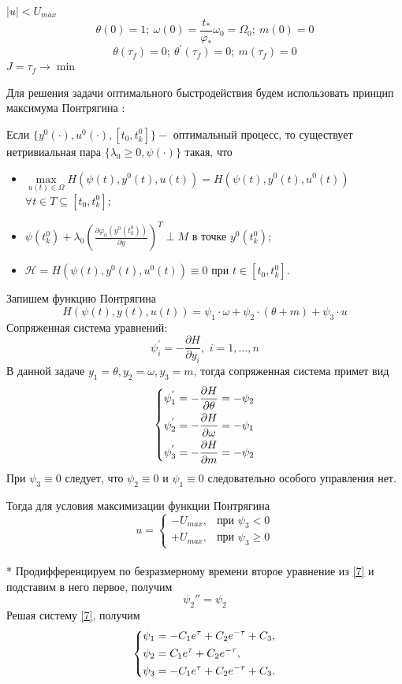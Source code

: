 \documentclass[a4paper,14pt]{article}
\theoremstyle{plain} %
\theoremstyle{definition} %
\theoremstyle{remark} %
\begin{document}
{$|u|<U_{max}$
\[
    \theta(0)=1;\ \omega(0)=\frac{t_\ast}{\varphi_\ast}\omega_0=\Omega_0;\ m(0)=0
\]
\[
    \theta(\tau_f)=0;\ \theta^{'}(\tau_f)=0;\ m(\tau_f)=0
\]
$J=\tau_f\to \min$

Для решения задачи оптимального быстродействия будем использовать принцип максимума Понтрягина \cite{Optimal}:

Если $\{y^0(\cdot),u^0(\cdot),[t_0,t_k^0]\} - $ оптимальный процесс, то существует нетривиальная пара $\{\lambda_0\geq0,\psi(\cdot)\}$
такая, что
\begin{itemize}
    \item $ \mathop {\max }\limits_{u(t) \in \Omega}  H(\psi(t),y^0(t),u(t))=H(\psi(t),y^0(t),u^0(t))$
          $\forall t \in T \subseteq [t_0,t_k^0];$
    \item $\psi(t_k^0)+\lambda_0(\frac{\partial \varphi_0(y^0(t_k^0))}{\partial y})^T \perp M \text{ в точке } y^0(t_k^0);$
    \item $\mathcal{H}=H(\psi(t),y^0(t),u^0(t))\equiv0 \text{ при } t \in [t_0,t_k^0].$
\end{itemize}
Запишем функцию Понтрягина
\[
    H(\psi(t),y(t),u(t))=\psi_1\cdot\omega+\psi_2\cdot(\theta+m)+\psi_3\cdot u
\]
Сопряженная система уравнений:
\[
    \psi^{'}_i  =  - \frac{{\partial H}}{{\partial y_i }},\,\,i = 1, \ldots ,n
\]
В данной задаче $y_1 = \theta, y_2 = \omega, y_3=m$, тогда сопряженная система примет вид
\begin{equation} \label{7}
    \left\{ {\begin{aligned}
                 & \psi^{'}_1=  - \frac{{\partial H}}{{\partial \theta}} = - \psi_2\hfill  \\
                 & \psi^{'}_2=  - \frac{{\partial H}}{{\partial \omega }} = - \psi_1\hfill \\
                 & \psi^{'}_3=  - \frac{{\partial H}}{{\partial m }} = - \psi_2 \hfill     \\
            \end{aligned}} \right.
\end{equation}
При $\psi_3\equiv0$ следует, что $\psi_2\equiv0$ и $\psi_1\equiv0$ следовательно особого управления нет.

Тогда для условия максимизации функции Понтрягина
\[
    u=
    \begin{cases}
        -U_{max}, & \text{при $\psi_3<0$}          \\
        +U_{max}, & \text{при $\psi_3\geqslant 0$}
    \end{cases}
\]\\*
Продифференцируем по безразмерному времени второе уравнение из \eqref{7} и подставим в него первое, получим
\[
    \psi_2 ''=\psi_2
\]
Решая систему \eqref{7}, получим
\[
    \left\{ {\begin{aligned}
                 & \psi_1 = -C_1e^\tau+C_2e^{-\tau}+C_3, \hfill  \\
                 & \psi_2 = C_1e^\tau+C_2e^{-\tau} , \hfill      \\
                 & \psi_3 = -C_1e^\tau+C_2e^{-\tau}+C_3 . \hfill \\
            \end{aligned}} \right.
\]

}
\end{document}
